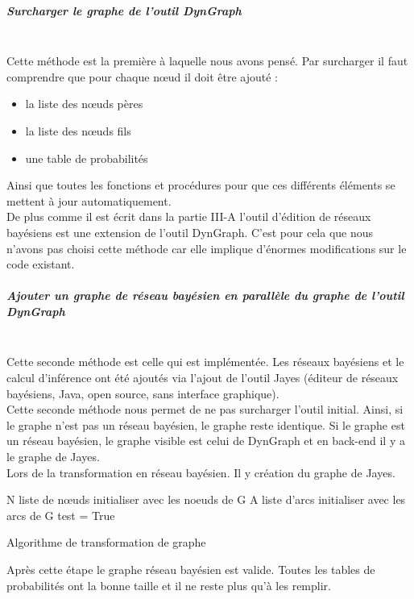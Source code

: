 \documentclass[conference]{IEEEtran}
\begin{document}
\subparagraph{Surcharger le graphe de l'outil DynGraph  \hfill } \\
Cette méthode est la première à laquelle nous avons pensé. Par surcharger il faut comprendre que pour chaque nœud il doit être ajouté : 
\begin{itemize}
\item la liste des nœuds pères 
\item la liste des nœuds fils
\item une table de probabilités 
\end{itemize}
Ainsi que toutes les fonctions et procédures pour que ces différents éléments se mettent à jour automatiquement. \\
De plus comme il est écrit dans la partie III-A l'outil d'édition de réseaux bayésiens est une extension de l'outil DynGraph. C'est pour cela que nous n'avons pas choisi cette méthode car elle implique d'énormes modifications sur le code existant. \\

\subparagraph{Ajouter un graphe de réseau bayésien en parallèle du graphe de l'outil DynGraph \hfill }
\\ Cette seconde méthode est celle qui est implémentée. Les réseaux bayésiens et le calcul d'inférence ont été ajoutés via l'ajout de l'outil Jayes (éditeur de réseaux bayésiens, Java, open source, sans interface graphique). \\
Cette seconde méthode nous permet de ne pas surcharger l'outil initial. Ainsi, si le graphe n'est pas un réseau bayésien, le graphe reste identique. Si le graphe est un réseau bayésien, le graphe visible est celui de DynGraph et en back-end il y a le graphe de Jayes.\\
Lors de la transformation en réseau bayésien. Il y création du graphe de Jayes. 

 \begin{algorithm}[H]
 N liste de nœuds initialiser avec les noeuds de G\;
 A liste d'arcs initialiser avec les arcs de G\;
 test = True\;
 \EndFor
 \EndFor 
\caption{Algorithme de transformation de graphe}
\end{algorithm}
\vspace{0.3cm}
Après cette étape le graphe réseau bayésien est valide. Toutes les tables de probabilités ont la bonne taille et il ne reste plus qu'à les remplir.
\end{document}
